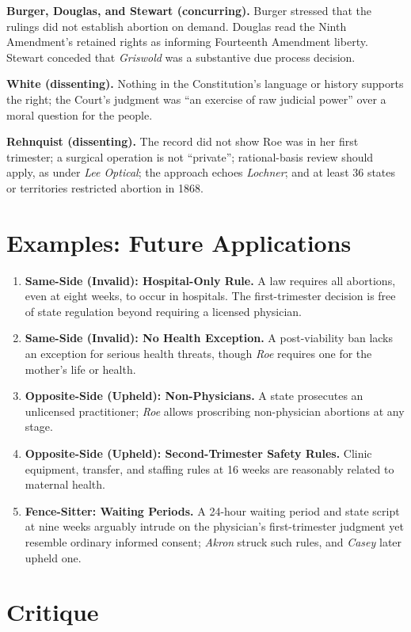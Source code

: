 \documentclass[12pt]{article}
\begin{document}
\textbf{Burger, Douglas, and Stewart (concurring).} Burger stressed that the rulings did not establish abortion on demand. Douglas read the Ninth Amendment's retained rights as informing Fourteenth Amendment liberty. Stewart conceded that \textit{Griswold} was a substantive due process decision.

\textbf{White (dissenting).} Nothing in the Constitution's language or history supports the right; the Court's judgment was ``an exercise of raw judicial power'' over a moral question for the people.

\textbf{Rehnquist (dissenting).} The record did not show Roe was in her first trimester; a surgical operation is not ``private''; rational-basis review should apply, as under \textit{Lee Optical}; the approach echoes \textit{Lochner}; and at least 36 states or territories restricted abortion in 1868.

\section{Examples: Future Applications}

\begin{enumerate}
\item \textbf{Same-Side (Invalid): Hospital-Only Rule.} A law requires all abortions, even at eight weeks, to occur in hospitals. The first-trimester decision is free of state regulation beyond requiring a licensed physician.
\item \textbf{Same-Side (Invalid): No Health Exception.} A post-viability ban lacks an exception for serious health threats, though \textit{Roe} requires one for the mother's life or health.
\item \textbf{Opposite-Side (Upheld): Non-Physicians.} A state prosecutes an unlicensed practitioner; \textit{Roe} allows proscribing non-physician abortions at any stage.
\item \textbf{Opposite-Side (Upheld): Second-Trimester Safety Rules.} Clinic equipment, transfer, and staffing rules at 16 weeks are reasonably related to maternal health.
\item \textbf{Fence-Sitter: Waiting Periods.} A 24-hour waiting period and state script at nine weeks arguably intrude on the physician's first-trimester judgment yet resemble ordinary informed consent; \textit{Akron} struck such rules, and \textit{Casey} later upheld one.
\end{enumerate}

\section{Critique}
\end{document}
